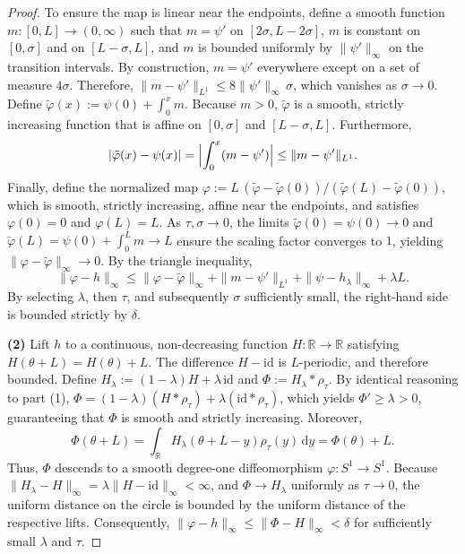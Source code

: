 \documentclass[12pt,a4paper]{amsart}
\theoremstyle{plain}
\theoremstyle{definition}
\theoremstyle{remark}
\begin{document}
\begin{proof}
To ensure the map is linear near the endpoints, define a smooth function $m \colon [0, L] \to (0,\infty)$ such that $m = \psi'$ on $[2\sigma, L-2\sigma]$, $m$ is constant on $[0,\sigma]$ and on $[L-\sigma, L]$, and $m$ is bounded uniformly by $\|\psi'\|_\infty$ on the transition intervals. By construction, $m = \psi'$ everywhere except on a set of measure $4\sigma$. Therefore, $\|m - \psi'\|_{L^1} \le 8\|\psi'\|_\infty\,\sigma$, which vanishes as $\sigma \to 0$. Define $\tilde{\varphi}(x) := \psi(0) + \int_0^x m$. Because $m > 0$, $\tilde{\varphi}$ is a smooth, strictly increasing function that is affine on $[0,\sigma]$ and $[L-\sigma, L]$. Furthermore,
$$|\tilde{\varphi}(x) - \psi(x)| = \Bigl|\int_0^x (m - \psi')\Bigr| \le \|m - \psi'\|_{L^1}.$$
Finally, define the normalized map $\varphi := L\,(\tilde{\varphi} - \tilde{\varphi}(0)) / (\tilde{\varphi}(L) - \tilde{\varphi}(0))$, which is smooth, strictly increasing, affine near the endpoints, and satisfies $\varphi(0)=0$ and $\varphi(L)=L$. As $\tau, \sigma \to 0$, the limits $\tilde{\varphi}(0) = \psi(0) \to 0$ and $\tilde{\varphi}(L) = \psi(0) + \int_0^L m \to L$ ensure the scaling factor converges to $1$, yielding $\|\varphi - \tilde{\varphi}\|_\infty \to 0$. By the triangle inequality,
$$\|\varphi - h\|_\infty \le \|\varphi - \tilde{\varphi}\|_\infty + \|m - \psi'\|_{L^1} + \|\psi - h_\lambda\|_\infty + \lambda L.$$
By selecting $\lambda$, then $\tau$, and subsequently $\sigma$ sufficiently small, the right-hand side is bounded strictly by $\delta$.

\textbf{(2)} Lift $h$ to a continuous, non-decreasing function $H \colon \mathbb{R} \to \mathbb{R}$ satisfying $H(\theta+L) = H(\theta)+L$. The difference $H - \mathrm{id}$ is $L$-periodic, and therefore bounded. Define $H_\lambda := (1-\lambda)H + \lambda\,\mathrm{id}$ and $\Phi := H_\lambda * \rho_\tau$. By identical reasoning to part (1), $\Phi = (1-\lambda)(H * \rho_\tau) + \lambda(\mathrm{id} * \rho_\tau)$, which yields $\Phi' \ge \lambda > 0$, guaranteeing that $\Phi$ is smooth and strictly increasing. Moreover, 
$$\Phi(\theta+L) = \int_{\mathbb{R}} H_\lambda(\theta+L-y)\rho_\tau(y)\,\mathrm{d}y = \Phi(\theta) + L.$$
Thus, $\Phi$ descends to a smooth degree-one diffeomorphism $\varphi \colon S^1 \to S^1$. Because $\|H_\lambda - H\|_\infty = \lambda\|H - \mathrm{id}\|_\infty < \infty$, and $\Phi \to H_\lambda$ uniformly as $\tau \to 0$, the uniform distance on the circle is bounded by the uniform distance of the respective lifts. Consequently, $\|\varphi - h\|_\infty \le \|\Phi - H\|_\infty < \delta$ for sufficiently small $\lambda$ and $\tau$.
\end{proof}
\end{document}
